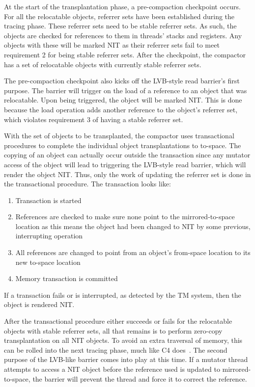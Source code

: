 \documentclass{sig-alternate}
\begin{document}
At the start of the transplantation phase, a pre-compaction checkpoint occurs.
For all the relocatable objects, referrer sets have been established during the tracing phase.
These referrer sets need to be stable referrer sets. As such, the objects are checked for 
references to them in threads' stacks and registers. Any objects with these will be 
marked NIT as their referrer sets fail to meet requirement 2 for being stable referrer sets.
After the checkpoint, the compactor has a set of relocatable objects with currently stable referrer sets.

The pre-compaction checkpoint also kicks off the LVB-style read barrier's first purpose. 
The barrier will trigger on the load of a reference to an object that was 
relocatable. Upon being triggered, the object will be marked NIT. This is done because
the load operation adds another reference to the object's referrer set, which violates
requirement 3 of having a stable referrer set.

With the set of objects to be transplanted, the compactor uses transactional
procedures to complete the individual object transplantations to to-space.
The copying of an object can actually occur outside the transaction since any
mutator access of the object will lead to triggering the LVB-style read barrier,
which will render the object NIT. Thus, only the work of updating the referrer set
is done in the transactional procedure. The transaction looks like:
\begin{enumerate}
\item Transaction is started
\item References are checked to make sure none point to the mirrored-to-space location as this means the object had been changed to NIT by some previous, interrupting operation
\item All references are changed to point from an object's from-space location to its new to-space location
\item Memory transaction is committed
\end{enumerate}
If a transaction fails or is interrupted, as detected by the TM system, then the object is rendered NIT.

After the transactional procedure either succeeds or fails for the 
relocatable objects with stable referrer sets, all that remains is to perform zero-copy transplantation
on all NIT objects. To avoid an extra traversal of memory, this can be rolled into the next tracing
phase, much like C4 does~\cite{Tene:C4}. The second purpose of the LVB-like barrier comes into play
at this time. If a mutator thread attempts to access a NIT object before the 
reference used is updated to mirrored-to-space, the barrier will prevent the thread and force it to 
correct the reference.
\end{document}
